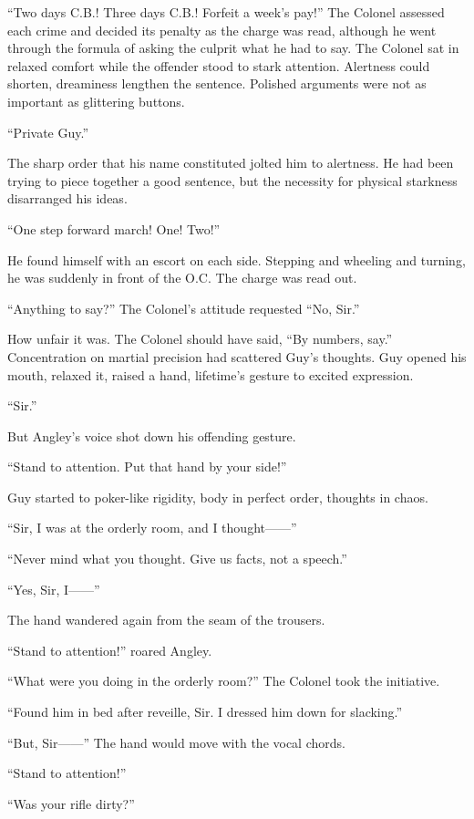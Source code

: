 ``Two days C.B.! Three days C.B.! Forfeit a week's pay!'' The Colonel 
assessed each crime and decided its penalty as the charge was read, 
although he went through the formula of asking the culprit what he 
had to say. The Colonel sat in relaxed comfort while the offender 
stood to stark attention. Alertness could shorten, dreaminess lengthen 
the sentence. Polished arguments were not as important as glittering 
buttons.

``Private Guy.''

The sharp order that his name constituted jolted him to alertness. He 
had been trying to piece together a good sentence, but the necessity 
for physical starkness disarranged his ideas.

``One step forward march! One! Two!''

He found himself with an escort on each side. Stepping and wheeling and 
turning, he was suddenly in front of the O.C. The charge was read out.

``Anything to say?'' The Colonel's attitude requested ``No, Sir.''

How unfair it was. The Colonel should have said, ``By numbers, say.'' 
Concentration on martial precision had scattered Guy's thoughts. Guy 
opened his mouth, relaxed it, raised a hand, lifetime's gesture to 
excited expression.

``Sir.''

But Angley's voice shot down his offending gesture.

``Stand to attention. Put that hand by your side!''

Guy started to poker-like rigidity, body in perfect order, thoughts 
in chaos.

``Sir, I was at the orderly room, and I thought------''

``Never mind what you thought. Give us facts, not a speech.''

``Yes, Sir, I------''

The hand wandered again from the seam  of the trousers.

``Stand to attention!'' roared Angley.

``What were you doing in the orderly room?'' The Colonel took the 
initiative.

``Found him in bed after reveille, Sir. I dressed him down for 
slacking.''

``But, Sir------'' The hand would move with the vocal chords.

``Stand to attention!''

``Was your rifle dirty?''

